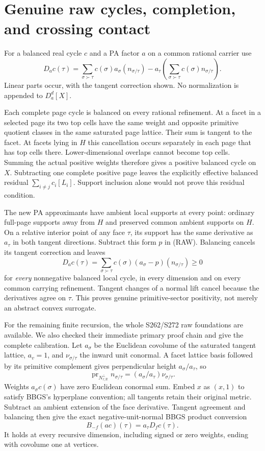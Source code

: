 \documentclass[11pt]{article}
\newcommand{\R}{\mathbb R}
\begin{document}
\section{Genuine raw cycles, completion, and crossing contact}\label{sec:raw}
For a balanced real cycle $c$ and a PA factor $a$ on a common rational carrier use
\[
 D_ac(\tau)=\sum_{\sigma\succ\tau}c(\sigma)a_\sigma(n_{\sigma/\tau})
 -a_\tau\left(\sum_{\sigma\succ\tau}c(\sigma)n_{\sigma/\tau}\right).       \tag{RAW}
\]
Linear parts occur, with the tangent correction shown. No normalization is appended to $D_a^d[X]$.

Each complete page cycle is balanced on every rational refinement. At a facet in a selected page its two top cells have the same weight and opposite primitive quotient classes in the same saturated page lattice. Their sum is tangent to the facet. At facets lying in $H$ this cancellation occurs separately in each page that has top cells there. Lower-dimensional overlaps cannot become top cells. Summing the actual positive weights therefore gives a positive balanced cycle on $X$. Subtracting one complete positive page leaves the explicitly effective balanced residual $\sum_{i\ne j}c_i[L_i]$. Support inclusion alone would not prove this residual condition.

The new PA approximants have ambient local supports at every point: ordinary full-page supports away from $H$ and preserved common ambient supports on $H$. On a relative interior point of any face $\tau$, its support has the same derivative as $a_\tau$ in both tangent directions. Subtract this form $p$ in (RAW). Balancing cancels its tangent correction and leaves
\[
 D_ac(\tau)=\sum_{\sigma\succ\tau}c(\sigma)(a_\sigma-p)(n_{\sigma/\tau})\geq0
\]
for \emph{every} nonnegative balanced local cycle, in every dimension and on every common carrying refinement. Tangent changes of a normal lift cancel because the derivatives agree on $\tau$. This proves genuine primitive-sector positivity, not merely an abstract convex surrogate.

For the remaining finite recursion, the whole S262/S272 raw foundations are available. We also checked their immediate primary proof chain and give the complete calibration. Let $a_\sigma$ be the Euclidean covolume of the saturated tangent lattice, $a_v=1$, and $\nu_{\sigma/\tau}$ the inward unit conormal. A facet lattice basis followed by its primitive complement gives perpendicular height $a_\sigma/a_\tau$, so
\[
 \operatorname{pr}_{N_{\tau,\R}^\perp}n_{\sigma/\tau}
   =(a_\sigma/a_\tau)\nu_{\sigma/\tau}.
\]
Weights $a_\sigma c(\sigma)$ have zero Euclidean conormal sum. Embed $x$ as $(x,1)$ to satisfy BBGS's hyperplane convention; all tangents retain their original metric. Subtract an ambient extension of the face derivative. Tangent agreement and balancing then give the exact negative-unit-normal BBGS product conversion
\[
 B_{-f}(ac)(\tau)=a_\tau D_fc(\tau).
\]
It holds at every recursive dimension, including signed or zero weights, ending with covolume one at vertices.
\end{document}

